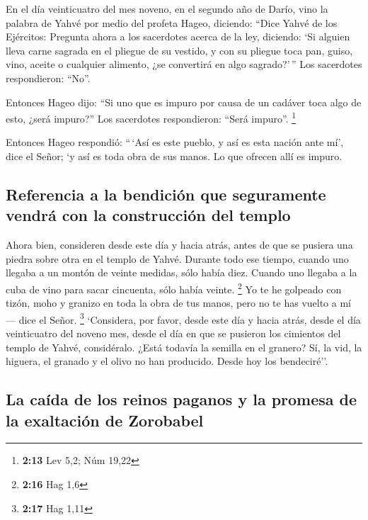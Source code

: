 \begin{paracol}{2}
 En el día veinticuatro del mes noveno, en el segundo año
de Darío, vino la palabra de Yahvé por medio del profeta Hageo,
diciendo:  ``Dice Yahvé de los Ejércitos: Pregunta ahora
a los sacerdotes acerca de la ley, diciendo:  `Si alguien
lleva carne sagrada en el pliegue de su vestido, y con su pliegue toca
pan, guiso, vino, aceite o cualquier alimento, ¿se convertirá en algo
sagrado?'\,'' Los sacerdotes respondieron: ``No''.

 Entonces Hageo dijo: ``Si uno que es impuro por causa de
un cadáver toca algo de esto, ¿será impuro?'' Los sacerdotes
respondieron: ``Será impuro''. \footnote{\textbf{2:13} Lev 5,2; Núm
  19,22}

 Entonces Hageo respondió: ``\,`Así es este pueblo, y así
es esta nación ante mí', dice el Señor; `y así es toda obra de sus
manos. Lo que ofrecen allí es impuro.

\hypertarget{referencia-a-la-bendiciuxf3n-que-seguramente-vendruxe1-con-la-construcciuxf3n-del-templo}{%
\subsection{Referencia a la bendición que seguramente vendrá con la
construcción del
templo}\label{referencia-a-la-bendiciuxf3n-que-seguramente-vendruxe1-con-la-construcciuxf3n-del-templo}}

 Ahora bien, consideren desde este día y hacia atrás,
antes de que se pusiera una piedra sobre otra en el templo de Yahvé.
 Durante todo ese tiempo, cuando uno llegaba a un montón
de veinte medidas, sólo había diez. Cuando uno llegaba a la cuba de vino
para sacar cincuenta, sólo había veinte. \footnote{\textbf{2:16} Hag 1,6}
 Yo te he golpeado con tizón, moho y granizo en toda la
obra de tus manos, pero no te has vuelto a mí --- dice el Señor.
\footnote{\textbf{2:17} Hag 1,11}  `Considera, por favor,
desde este día y hacia atrás, desde el día veinticuatro del noveno mes,
desde el día en que se pusieron los cimientos del templo de Yahvé,
considéralo.  ¿Está todavía la semilla en el granero? Sí,
la vid, la higuera, el granado y el olivo no han producido. Desde hoy
los bendeciré''.

\hypertarget{la-cauxedda-de-los-reinos-paganos-y-la-promesa-de-la-exaltaciuxf3n-de-zorobabel}{%
\subsection{La caída de los reinos paganos y la promesa de la exaltación
de
Zorobabel}\label{la-cauxedda-de-los-reinos-paganos-y-la-promesa-de-la-exaltaciuxf3n-de-zorobabel}}


\end{paracol}
